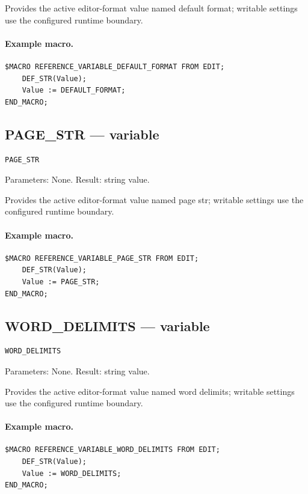 \documentclass[a4paper,10pt,twoside,openany]{book}
\begin{document}
Provides the active editor-format value named default format; writable settings use the configured runtime boundary.

\paragraph{Example macro.}
\begin{verbatim}
$MACRO REFERENCE_VARIABLE_DEFAULT_FORMAT FROM EDIT;
    DEF_STR(Value);
    Value := DEFAULT_FORMAT;
END_MACRO;
\end{verbatim}

\label{prim:variable-page-str}
\subsection*{PAGE\_STR --- variable}
\begin{verbatim}
PAGE_STR
\end{verbatim}
Parameters: None. Result: string value.

Provides the active editor-format value named page str; writable settings use the configured runtime boundary.

\paragraph{Example macro.}
\begin{verbatim}
$MACRO REFERENCE_VARIABLE_PAGE_STR FROM EDIT;
    DEF_STR(Value);
    Value := PAGE_STR;
END_MACRO;
\end{verbatim}

\label{prim:variable-word-delimits}
\subsection*{WORD\_DELIMITS --- variable}
\begin{verbatim}
WORD_DELIMITS
\end{verbatim}
Parameters: None. Result: string value.

Provides the active editor-format value named word delimits; writable settings use the configured runtime boundary.

\paragraph{Example macro.}
\begin{verbatim}
$MACRO REFERENCE_VARIABLE_WORD_DELIMITS FROM EDIT;
    DEF_STR(Value);
    Value := WORD_DELIMITS;
END_MACRO;
\end{verbatim}
\end{document}
